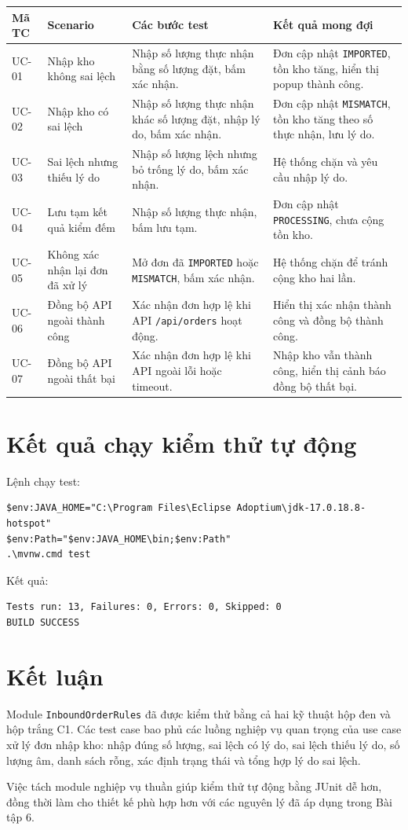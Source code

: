 \documentclass[12pt,a4paper]{article}
\begin{document}
\begin{longtable}{|p{1.4cm}|p{3.3cm}|p{5.1cm}|p{4.4cm}|}
\hline
\textbf{Mã TC} & \textbf{Scenario} & \textbf{Các bước test} & \textbf{Kết quả mong đợi} \\
\hline
UC-01 & Nhập kho không sai lệch & Nhập số lượng thực nhận bằng số lượng đặt, bấm xác nhận. & Đơn cập nhật \texttt{IMPORTED}, tồn kho tăng, hiển thị popup thành công. \\
\hline
UC-02 & Nhập kho có sai lệch & Nhập số lượng thực nhận khác số lượng đặt, nhập lý do, bấm xác nhận. & Đơn cập nhật \texttt{MISMATCH}, tồn kho tăng theo số thực nhận, lưu lý do. \\
\hline
UC-03 & Sai lệch nhưng thiếu lý do & Nhập số lượng lệch nhưng bỏ trống lý do, bấm xác nhận. & Hệ thống chặn và yêu cầu nhập lý do. \\
\hline
UC-04 & Lưu tạm kết quả kiểm đếm & Nhập số lượng thực nhận, bấm lưu tạm. & Đơn cập nhật \texttt{PROCESSING}, chưa cộng tồn kho. \\
\hline
UC-05 & Không xác nhận lại đơn đã xử lý & Mở đơn đã \texttt{IMPORTED} hoặc \texttt{MISMATCH}, bấm xác nhận. & Hệ thống chặn để tránh cộng kho hai lần. \\
\hline
UC-06 & Đồng bộ API ngoài thành công & Xác nhận đơn hợp lệ khi API \texttt{/api/orders} hoạt động. & Hiển thị xác nhận thành công và đồng bộ thành công. \\
\hline
UC-07 & Đồng bộ API ngoài thất bại & Xác nhận đơn hợp lệ khi API ngoài lỗi hoặc timeout. & Nhập kho vẫn thành công, hiển thị cảnh báo đồng bộ thất bại. \\
\hline
\end{longtable}

\section{Kết quả chạy kiểm thử tự động}

Lệnh chạy test:

\begin{verbatim}
$env:JAVA_HOME="C:\Program Files\Eclipse Adoptium\jdk-17.0.18.8-hotspot"
$env:Path="$env:JAVA_HOME\bin;$env:Path"
.\mvnw.cmd test
\end{verbatim}

Kết quả:

\begin{verbatim}
Tests run: 13, Failures: 0, Errors: 0, Skipped: 0
BUILD SUCCESS
\end{verbatim}

\section{Kết luận}

Module \texttt{InboundOrderRules} đã được kiểm thử bằng cả hai kỹ thuật hộp đen và hộp trắng C1. Các test case bao phủ các luồng nghiệp vụ quan trọng của use case xử lý đơn nhập kho: nhập đúng số lượng, sai lệch có lý do, sai lệch thiếu lý do, số lượng âm, danh sách rỗng, xác định trạng thái và tổng hợp lý do sai lệch.

Việc tách module nghiệp vụ thuần giúp kiểm thử tự động bằng JUnit dễ hơn, đồng thời làm cho thiết kế phù hợp hơn với các nguyên lý đã áp dụng trong Bài tập 6.
\end{document}
